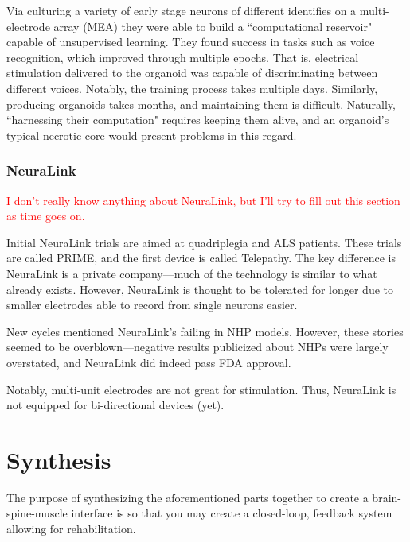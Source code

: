 Via culturing a variety of early stage neurons of different identifies on a multi-electrode array (MEA) they were able to build a ``computational reservoir" capable of unsupervised learning. They found success in tasks such as voice recognition, which improved through multiple epochs. That is, electrical stimulation delivered to the organoid was capable of discriminating between different voices. Notably, the training process takes multiple days. Similarly, producing organoids takes months, and maintaining them is difficult. Naturally, ``harnessing their computation" requires keeping them alive, and an organoid's typical necrotic core would present problems in this regard. 


\subsection{NeuraLink}

\textcolor{red}{I don't really know anything about NeuraLink, but I'll try to fill out this section as time goes on. }\newline

Initial NeuraLink trials are aimed at quadriplegia and ALS patients. These trials are called PRIME, and the first device is called Telepathy. The key difference is NeuraLink is a private company---much of the technology is similar to what already exists. However, NeuraLink is thought to be tolerated for longer due to smaller electrodes able to record from single neurons easier. \newline

New cycles mentioned NeuraLink's failing in NHP models. However, these stories seemed to be overblown---negative results publicized about NHPs were largely overstated, and NeuraLink did indeed pass FDA approval.\newline

Notably, multi-unit electrodes are not great for stimulation. Thus, NeuraLink is not equipped for bi-directional devices (yet). 



\chapter{Synthesis}

The purpose of synthesizing the aforementioned parts together to create a brain-spine-muscle interface is so that you may create a closed-loop, feedback system allowing for rehabilitation. 


